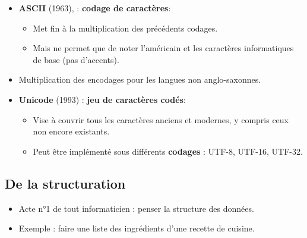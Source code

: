 \begin{slide}
	\begin{itemize}
		\item \textbf{ASCII} (1963),  : \textbf{codage de caractères}:
			\begin{itemize}
				\item Met fin à la multiplication des précédents codages.
				\item Mais ne permet que de noter l'américain et les caractères informatiques de base (pas d'accents).
			\end{itemize}
		\item Multiplication des encodages pour les langues non anglo-saxonnes.
		\item \textbf{Unicode} (1993) : \textbf{jeu de caractères codés}:
			\begin{itemize}
				\item Vise à couvrir tous les caractères anciens et modernes, y compris ceux non encore existants.
				\item Peut être implémenté sous différents \textbf{codages} : UTF-8, UTF-16, UTF-32.
			\end{itemize}
	\end{itemize}
\end{slide}

\subsection{De la structuration}
\begin{slide}
	\begin{itemize}
		\item Acte n°1 de tout informaticien : penser la structure des données.
		\item Exemple : faire une liste des ingrédients d'une recette de cuisine.
	\end{itemize}
\end{slide}

